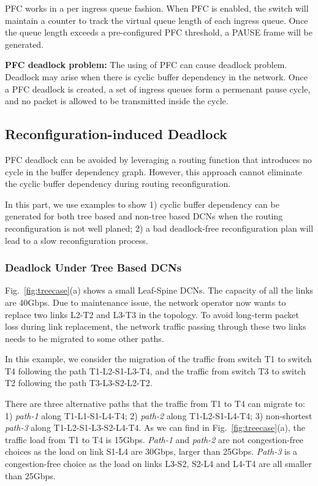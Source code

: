 PFC works in a per ingress queue fashion. When PFC is enabled, the switch will maintain a counter to track the virtual queue length of each ingress queue. Once the queue length exceeds a pre-configured PFC threshold, a PAUSE frame will be generated.

\textbf{PFC deadlock problem:} The using of PFC can cause deadlock problem. Deadlock may arise when there is cyclic buffer dependency in the network. Once a PFC deadlock is created, a set of ingress queues form a permenant pause cycle, and no packet is allowed to be transmitted inside the cycle.


\subsection{Reconfiguration-induced Deadlock}\label{subsec:reconfigdeadlock}

PFC deadlock can be avoided by leveraging a routing function that introduces no cycle in the buffer dependency graph. However, this approach cannot eliminate the cyclic buffer dependency during routing reconfiguration.

In this part, we use examples to show 1) cyclic buffer dependency can be generated for both tree based and non-tree based DCNs when the routing reconfiguration is not well planed; 2) a bad deadlock-free reconfiguration plan will lead to a slow reconfiguration process.

\subsubsection{Deadlock Under Tree Based DCNs}\label{subsubsec:treecase}

Fig.~\ref{fig:treecase}(a) shows a small Leaf-Spine DCNs. The capacity of all the links are 40Gbps. Due to maintenance issue, the network operator now wants to replace two links L2-T2 and L3-T3 in the topology. To avoid long-term packet loss during link replacement, the network traffic passing through these two links needs to be migrated to some other paths. 

In this example, we consider the migration of the traffic from switch T1 to switch T4 following the path T1-L2-S1-L3-T4, and the traffic from switch T3 to switch T2 following the path T3-L3-S2-L2-T2. 

There are three alternative paths that the traffic from T1 to T4 can migrate to: 1) \textit{path-1} along T1-L1-S1-L4-T4; 2) \textit{path-2} along T1-L2-S1-L4-T4; 3) non-shortest \textit{path-3} along T1-L2-S1-L3-S2-L4-T4. As we can find in Fig.~\ref{fig:treecase}(a), the traffic load from T1 to T4 is 15Gbps. \textit{Path-1} and \textit{path-2} are not congestion-free choices as the load on link S1-L4 are 30Gbps, larger than 25Gbps. \textit{Path-3} is a congestion-free choice as the load on links L3-S2, S2-L4 and L4-T4 are all smaller than 25Gbps. 

